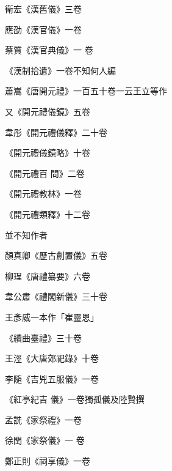 
\begin{pinyinscope}

 衛宏《漢舊儀》三卷



 應劭《漢官儀》一卷



 蔡質《漢官典儀》一
 卷



 《漢制拾遺》一卷不知何人編



 蕭嵩《唐開元禮》一百五十卷一云王立等作



 又《開元禮儀鏡》五卷



 韋彤《開元禮儀釋》二十卷



 《開元禮儀鏡略》十卷



 《開元禮百
 問》二卷



 《開元禮教林》一卷



 《開元禮類釋》十二卷



 並不知作者



 顏真卿《歷古創置儀》五卷



 柳珵《唐禮纂要》六卷



 韋公肅《禮閣新儀》三十卷



 王彥威一本作「崔靈恩」



 《續曲臺禮》三十卷



 王涇《大唐郊祀錄》十卷



 李隨《吉兇五服儀》一卷



 《紅亭紀吉
 儀》一卷獨孤儀及陸贄撰



 孟詵《家祭禮》一卷



 徐閏《家祭儀》一
 卷



 鄭正則《祠享儀》一卷




\end{pinyinscope}
